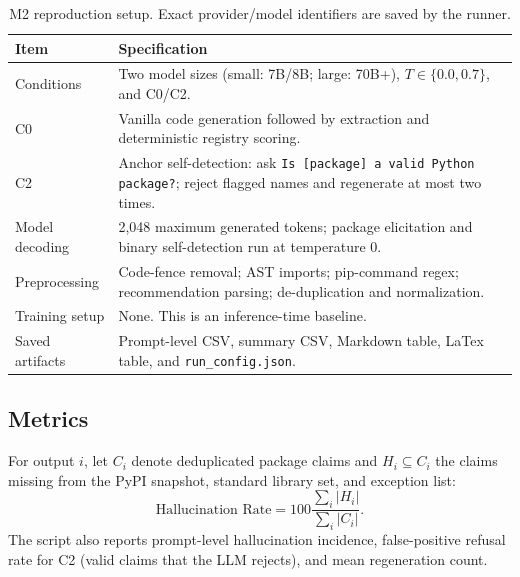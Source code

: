 \documentclass[11pt,a4paper]{article}
\begin{document}
\begin{table}[h]
\centering
\small
\begin{tabular}{p{4.3cm}p{8.4cm}}
\toprule
\textbf{Item} & \textbf{Specification}\\
\midrule
Conditions & Two model sizes (small: 7B/8B; large: 70B+), $T\in\{0.0,0.7\}$, and C0/C2.\\
C0 & Vanilla code generation followed by extraction and deterministic registry scoring.\\
C2 & Anchor self-detection: ask \texttt{Is [package] a valid Python package?}; reject flagged names and regenerate at most two times.\\
Model decoding & 2,048 maximum generated tokens; package elicitation and binary self-detection run at temperature 0.\\
Preprocessing & Code-fence removal; AST imports; pip-command regex; recommendation parsing; de-duplication and normalization.\\
Training setup & None. This is an inference-time baseline.\\
Saved artifacts & Prompt-level CSV, summary CSV, Markdown table, LaTex table, and \texttt{run\_config.json}.\\
\bottomrule
\end{tabular}
\caption{M2 reproduction setup. Exact provider/model identifiers are saved by the runner.}
\label{tab:m2setup}
\end{table}

\subsection{Metrics}
For output $i$, let $C_i$ denote deduplicated package claims and $H_i \subseteq C_i$ the claims missing from the PyPI snapshot, standard library set, and exception list:
\[
\text{Hallucination Rate} = 100\frac{\sum_i |H_i|}{\sum_i |C_i|}.
\]
The script also reports prompt-level hallucination incidence, false-positive refusal rate for C2 (valid claims that the LLM rejects), and mean regeneration count.
\end{document}
